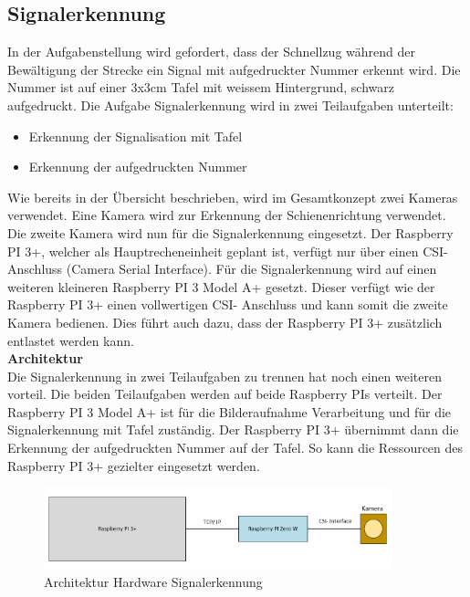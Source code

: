 \documentclass[../../main.tex]{subfiles}
\begin{document}
\subsection{Signalerkennung}
    In der Aufgabenstellung wird gefordert, dass der Schnellzug während der Bewältigung der Strecke ein Signal mit aufgedruckter Nummer erkennt wird. Die Nummer ist auf einer 3x3cm Tafel mit weissem Hintergrund, schwarz aufgedruckt. Die Aufgabe Signalerkennung wird in zwei Teilaufgaben unterteilt:
    \begin{itemize}
        \item Erkennung der Signalisation mit Tafel
        \item Erkennung der aufgedruckten Nummer
    \end{itemize}
    Wie bereits in der Übersicht beschrieben, wird im Gesamtkonzept zwei Kameras verwendet. Eine Kamera wird zur Erkennung der Schienenrichtung verwendet. Die zweite Kamera wird nun für die Signalerkennung eingesetzt. Der Raspberry PI 3+, welcher als Hauptrecheneinheit geplant ist, verfügt nur über einen CSI- Anschluss (Camera Serial Interface). Für die Signalerkennung wird auf einen weiteren kleineren Raspberry PI 3 Model A+ gesetzt. Dieser verfügt wie der Raspberry PI 3+ einen vollwertigen CSI- Anschluss und kann somit die zweite Kamera bedienen. Dies führt auch dazu, dass der Raspberry PI 3+ zusätzlich entlastet werden kann.\\

    \textbf{Architektur}\\
    Die Signalerkennung in zwei Teilaufgaben zu trennen hat noch einen weiteren vorteil. Die beiden Teilaufgaben werden auf beide Raspberry PIs verteilt. Der Raspberry PI 3 Model A+ ist für die Bilderaufnahme Verarbeitung und für die Signalerkennung mit Tafel zuständig. Der Raspberry PI 3+ übernimmt dann die Erkennung der aufgedruckten Nummer auf der Tafel. So kann die Ressourcen des Raspberry PI 3+ gezielter eingesetzt werden.

    \begin{figure}[H] %
        \centering
        \includegraphics[width=0.9\textwidth]{Architektur.png}
        \caption{Architektur Hardware Signalerkennung}
        \label{fig:architektur_hardware_signalerkennung}
    \end{figure}
\end{document}
